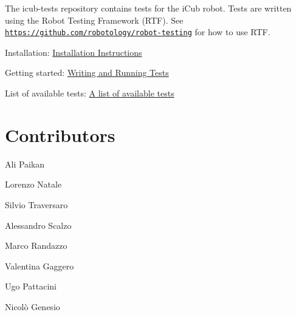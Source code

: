 The {\ttfamily icub-\/tests} repository contains tests for the i\+Cub robot. Tests are written using the Robot Testing Framework (R\+TF). See \href{https://github.com/robotology/robot-testing}{\tt https\+://github.\+com/robotology/robot-\/testing} for how to use R\+TF.

\begin{DoxyItemize}
\item Installation\+: \hyperlink{installation}{Installation Instructions} \item Getting started\+: \hyperlink{writing-and-running}{Writing and Running Tests} \item List of available tests\+: \hyperlink{group__icub-tests}{A list of available tests}\end{DoxyItemize}
\hypertarget{index_contributors}{}\section{Contributors}\label{index_contributors}
\begin{DoxyItemize}
\item Ali Paikan \item Lorenzo Natale \item Silvio Traversaro \item Alessandro Scalzo \item Marco Randazzo \item Valentina Gaggero \item Ugo Pattacini \item Nicolò Genesio \end{DoxyItemize}
